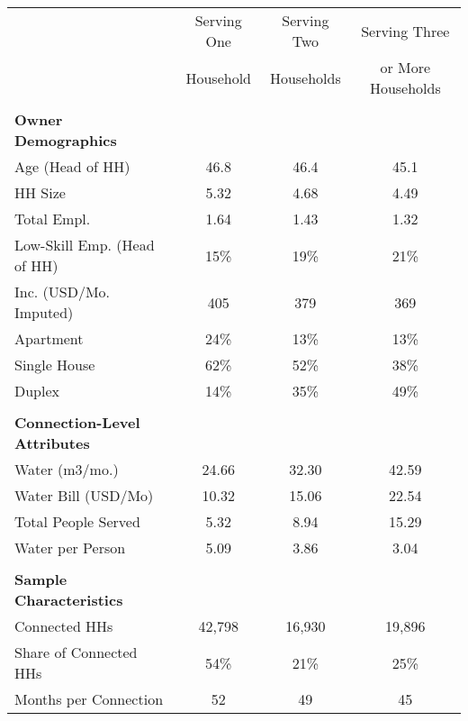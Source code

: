 \begin{tabular}{l*{1}{ccc}}
\hline
\hline 
 &Serving One &Serving Two &Serving Three  \\
 &Household &Households &or More Households  \\
\hline \\
\textbf{Owner Demographics} &\multicolumn{3}{c}{ }\\
\hline
Age (Head of HH) &       46.8  &       46.4  &       45.1   \\
HH Size &       5.32  &       4.68  &       4.49   \\
Total Empl. &       1.64  &       1.43  &       1.32   \\
Low-Skill Emp. (Head of HH) &         15\% &         19\% &         21\%  \\
Inc. (USD/Mo. Imputed) &        405  &        379  &        369   \\
Apartment &         24\% &         13\% &         13\%  \\
Single House &         62\% &         52\% &         38\%  \\
Duplex &         14\% &         35\% &         49\%  \\
\hline \\
\textbf{Connection-Level Attributes} &\multicolumn{3}{c}{ }\\
\hline
Water (m3/mo.) &      24.66  &      32.30  &      42.59   \\
Water Bill (USD/Mo) &      10.32  &      15.06  &      22.54   \\
Total People Served &       5.32  &       8.94  &      15.29   \\
Water per Person &       5.09  &       3.86  &       3.04   \\
\hline \\
\textbf{Sample Characteristics} &\multicolumn{3}{c}{ }\\
\hline
Connected HHs &     42,798  &     16,930  &     19,896   \\
Share of Connected HHs &         54\% &         21\% &         25\%  \\
Months per Connection &         52  &         49  &         45   \\
\hline
\hline
\end{tabular}